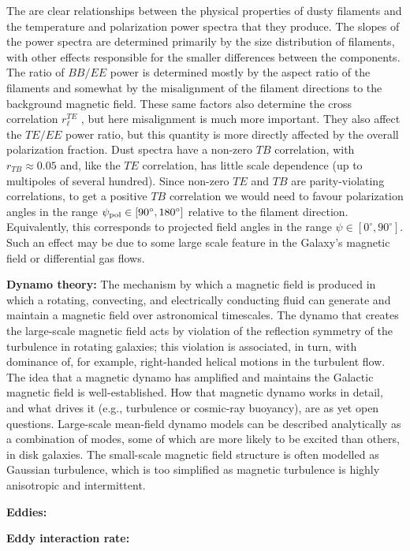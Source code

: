 \documentclass[a4paper,10pt]{article}
\begin{document}
{\noindent}The are clear relationships between the physical properties of dusty filaments and the temperature and polarization power spectra that they produce. The slopes of the power spectra are determined primarily by the size distribution of filaments, with other effects responsible for the smaller differences between the components. The ratio of $BB/EE$ power is determined mostly by the aspect ratio of the filaments and somewhat by the misalignment of the filament directions to the background magnetic field. These same factors also determine the cross correlation $r_\ell^{TE}$ , but here misalignment is much more important. They also affect the $TE/EE$ power ratio, but this quantity is more directly affected by the overall polarization fraction. Dust spectra have a non-zero $TB$ correlation, with $r_{TB}\approx0.05$ and, like the $TE$ correlation, has little scale dependence (up to multipoles of several hundred). Since non-zero $TE$ and $TB$ are parity-violating correlations, to get a positive $TB$ correlation we would need to favour polarization angles in the range $\psi_{\rm pol}\in[90^\circ,180^\circ]$ relative to the filament direction. Equivalently, this corresponds to projected field angles in the range $\psi\in [0^\circ,90^\circ]$. Such an effect may be due to some large scale feature in the Galaxy's magnetic field or differential gas flows.

{\noindent}\textbf{Dynamo theory:} The mechanism by which a magnetic field is produced in which a rotating, convecting, and electrically conducting fluid can generate and maintain a magnetic field over astronomical timescales. The dynamo that creates the large-scale magnetic field acts by violation of the reflection symmetry of the turbulence in rotating galaxies; this violation is associated, in turn, with dominance of, for example, right-handed helical motions in the turbulent flow. The idea that a magnetic dynamo has amplified and maintains the Galactic magnetic field is well-established. How that magnetic dynamo works in detail, and what drives it (e.g., turbulence or cosmic-ray buoyancy), are as yet open questions. Large-scale mean-field dynamo models can be described analytically as a combination of modes, some of which are more likely to be excited than others, in disk galaxies. The small-scale magnetic field structure is often modelled as Gaussian turbulence, which is too simplified as magnetic turbulence is highly anisotropic and intermittent. 

{\noindent}\textbf{Eddies:}

{\noindent}\textbf{Eddy interaction rate:}
\end{document}
